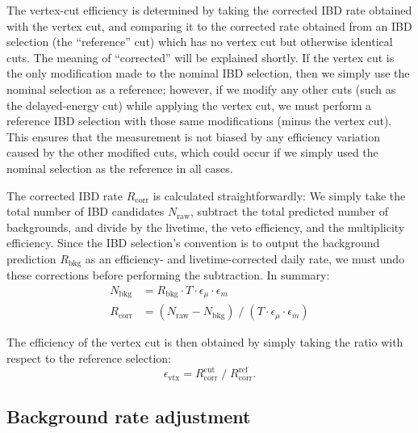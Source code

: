 \documentclass[../thesis.tex]{subfiles}
\begin{document}
The vertex-cut efficiency is determined by taking the corrected IBD rate obtained with the vertex cut, and comparing it to the corrected rate obtained from an IBD selection (the ``reference'' cut) which has no vertex cut but otherwise identical cuts. The meaning of ``corrected'' will be explained shortly. If the vertex cut is the only modification made to the nominal IBD selection, then we simply use the nominal selection as a reference; however, if we modify any other cuts (such as the delayed-energy cut) while applying the vertex cut, we must perform a reference IBD selection with those same modifications (minus the vertex cut). This ensures that the measurement is not biased by any efficiency variation caused by the other modified cuts, which could occur if we simply used the nominal selection as the reference in all cases.

The corrected IBD rate $R_{\mathrm{corr}}$ is calculated straightforwardly: We simply take the total number of IBD candidates $N_{\mathrm{raw}}$, subtract the total predicted number of backgrounds, and divide by the livetime, the veto efficiency, and the multiplicity efficiency.
Since the IBD selection's convention is to output the background prediction $R_{\mathrm{bkg}}$ as an efficiency- and livetime-corrected daily rate, we must undo these corrections before performing the subtraction. In summary:
\begin{equation}
  \begin{aligned}
  N_{\mathrm{bkg}} &= R_{\mathrm{bkg}} \cdot T \cdot \epsilon_\mu \cdot \epsilon_m\\
  R_{\mathrm{corr}} &= (N_{\mathrm{raw}} - N_{\mathrm{bkg}}) \;/\; (T \cdot \epsilon_\mu \cdot \epsilon_m)
\end{aligned}
\end{equation}

The efficiency of the vertex cut is then obtained by simply taking the ratio with respect to the reference selection:
\begin{equation}
  \epsilon_{\mathrm{vtx}} = R_{\mathrm{corr}}^{\mathrm{cut}} \;/\; R_{\mathrm{corr}}^{\mathrm{ref}}.
\end{equation}

\subsection{Background rate adjustment}
\label{sec:cutVaryVtxCutBkgRate}
\end{document}

